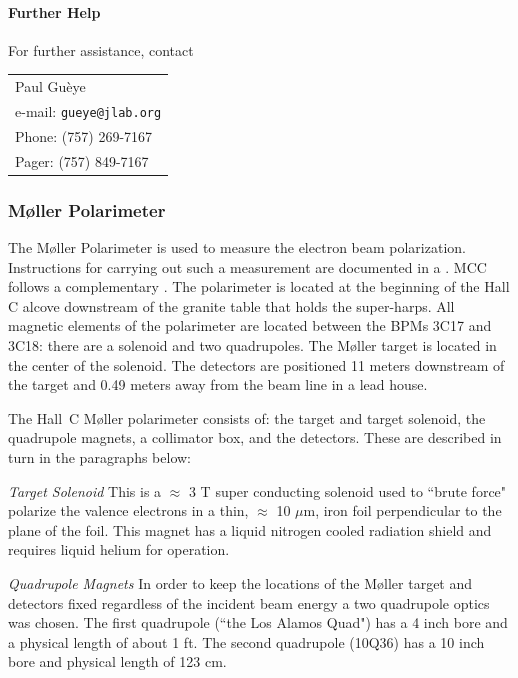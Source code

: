 \paragraph{Further Help}

For further assistance, contact
\par
\noindent
\begin{table}[!ht]
\begin{tabular}{l}
Paul Gu\`eye \\
e-mail: {\tt gueye@jlab.org} \\
Phone: (757) 269-7167 \\
Pager: (757) 849-7167 \\
\end{tabular}
\end{table}



\subsubsection{M\o ller Polarimeter }
The M\o ller Polarimeter is used to measure the electron beam
polarization. Instructions for carrying out such a measurement
are documented in a 
.
MCC follows a complementary 
.
The polarimeter is located at the beginning of the Hall C
alcove downstream of the granite table that holds the super-harps.
All magnetic elements of the polarimeter are located between
the BPMs 3C17 and 3C18: there are a solenoid and two quadrupoles.
The M\o ller target is located in the center of the solenoid. The
detectors are positioned 11 meters downstream of the target and 0.49
meters away from the beam line in a lead house.

The Hall~C M\o ller polarimeter consists of: the target and target solenoid, the quadrupole magnets, a 
collimator box, and the detectors.  These are described in turn in 
the paragraphs below:

{\sl Target Solenoid} This is a $\approx$ 3 T super conducting
solenoid used to ``brute force" polarize the valence electrons in a
thin, $\approx$ 10 $\mu$m, iron foil perpendicular to the
plane of the foil. This magnet has a liquid nitrogen cooled radiation shield
and requires liquid helium for operation.

{\sl Quadrupole Magnets} In order to keep the locations of the M\o ller
target and detectors fixed regardless of the incident beam energy
a two quadrupole optics was chosen. The first quadrupole (``the Los Alamos Quad")
has a 4 inch bore and a physical length of about 1 ft.
The second quadrupole (10Q36) has a 10 inch bore and physical length of 123 cm.


